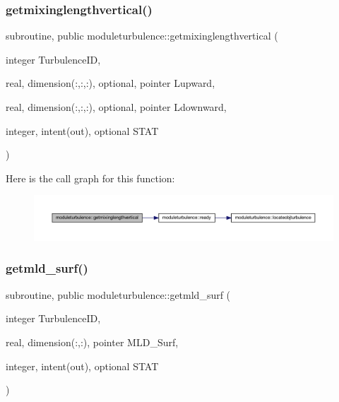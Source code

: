 \subsubsection{\texorpdfstring{getmixinglengthvertical()}{getmixinglengthvertical()}}
{\footnotesize\ttfamily subroutine, public moduleturbulence\+::getmixinglengthvertical (\begin{DoxyParamCaption}\item[{integer}]{Turbulence\+ID,  }\item[{real, dimension(\+:,\+:,\+:), optional, pointer}]{Lupward,  }\item[{real, dimension(\+:,\+:,\+:), optional, pointer}]{Ldownward,  }\item[{integer, intent(out), optional}]{S\+T\+AT }\end{DoxyParamCaption})}

Here is the call graph for this function\+:\nopagebreak
\begin{figure}[H]
\begin{center}
\leavevmode
\includegraphics[width=350pt]{namespacemoduleturbulence_a9ca6f654636dff4860b7e20134c59253_cgraph}
\end{center}
\end{figure}
\mbox{\label{namespacemoduleturbulence_a8e849950710589a5439a724899ac2b8d}} 
\subsubsection{\texorpdfstring{getmld\+\_\+surf()}{getmld\_surf()}}
{\footnotesize\ttfamily subroutine, public moduleturbulence\+::getmld\+\_\+surf (\begin{DoxyParamCaption}\item[{integer}]{Turbulence\+ID,  }\item[{real, dimension(\+:,\+:), pointer}]{M\+L\+D\+\_\+\+Surf,  }\item[{integer, intent(out), optional}]{S\+T\+AT }\end{DoxyParamCaption})}

